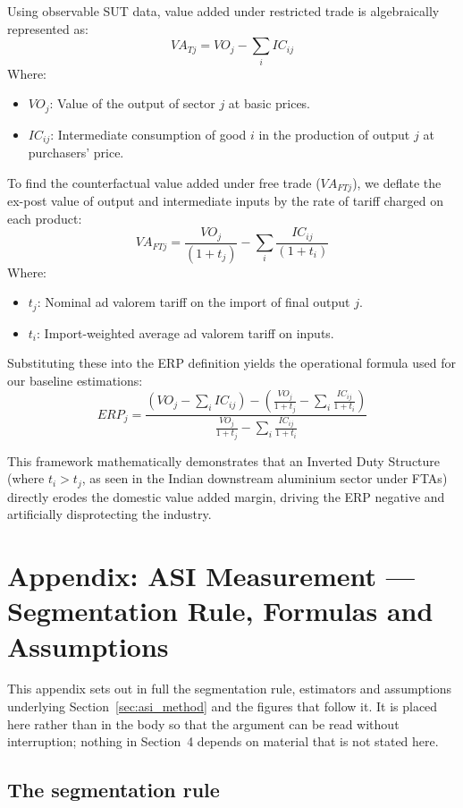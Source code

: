 \documentclass[11pt, a4paper]{article}
\numberwithin{figure}{section}
\numberwithin{table}{section}
\begin{document}
Using observable SUT data, value added under restricted trade is algebraically represented as:
$$ VA_{Tj} = VO_j - \sum_i IC_{ij} $$
Where:
\begin{itemize}
    \item $VO_j$: Value of the output of sector $j$ at basic prices.
    \item $IC_{ij}$: Intermediate consumption of good $i$ in the production of output $j$ at purchasers' price.
\end{itemize}

To find the counterfactual value added under free trade ($VA_{FTj}$), we deflate the ex-post value of output and intermediate inputs by the rate of tariff charged on each product:
$$ VA_{FTj} = \frac{VO_j}{(1+t_j)} - \sum_i \frac{IC_{ij}}{(1+t_i)} $$
Where:
\begin{itemize}
    \item $t_j$: Nominal ad valorem tariff on the import of final output $j$.
    \item $t_i$: Import-weighted average ad valorem tariff on inputs.
\end{itemize}

Substituting these into the ERP definition yields the operational formula used for our baseline estimations:
$$ ERP_j = \frac{ \left(VO_j - \sum_i IC_{ij}\right) - \left( \frac{VO_j}{1+t_j} - \sum_i \frac{IC_{ij}}{1+t_i} \right) }{ \frac{VO_j}{1+t_j} - \sum_i \frac{IC_{ij}}{1+t_i} } $$

This framework mathematically demonstrates that an Inverted Duty Structure (where $t_i > t_j$, as seen in the Indian downstream aluminium sector under FTAs) directly erodes the domestic value added margin, driving the ERP negative and artificially disprotecting the industry.

\newpage
\section{Appendix: ASI Measurement --- Segmentation Rule, Formulas and Assumptions}
\label{app:asi}

This appendix sets out in full the segmentation rule, estimators and assumptions
underlying Section~\ref{sec:asi_method} and the figures that follow it. It is
placed here rather than in the body so that the argument can be read without
interruption; nothing in Section~4 depends on material that is not stated here.

\subsection{The segmentation rule}
\label{app:asi_rule}
\end{document}
